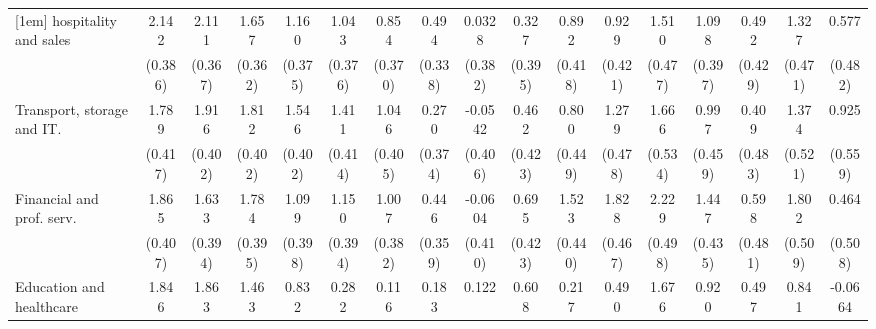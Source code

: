 {\begin{tabular}{l*{16}{c}}
[1em]
hospitality and sales&       2.142\sym{***}&       2.111\sym{***}&       1.657\sym{***}&       1.160\sym{**} &       1.043\sym{**} &       0.854\sym{*}  &       0.494         &      0.0328         &       0.327         &       0.892\sym{*}  &       0.929\sym{*}  &       1.510\sym{**} &       1.098\sym{**} &       0.492         &       1.327\sym{**} &       0.577         \\
                    &     (0.386)         &     (0.367)         &     (0.362)         &     (0.375)         &     (0.376)         &     (0.370)         &     (0.338)         &     (0.382)         &     (0.395)         &     (0.418)         &     (0.421)         &     (0.477)         &     (0.397)         &     (0.429)         &     (0.471)         &     (0.482)         \\
[1em]
Transport, storage and IT.&       1.789\sym{***}&       1.916\sym{***}&       1.812\sym{***}&       1.546\sym{***}&       1.411\sym{***}&       1.046\sym{**} &       0.270         &     -0.0542         &       0.462         &       0.800         &       1.279\sym{**} &       1.666\sym{**} &       0.997\sym{*}  &       0.409         &       1.374\sym{**} &       0.925         \\
                    &     (0.417)         &     (0.402)         &     (0.402)         &     (0.402)         &     (0.414)         &     (0.405)         &     (0.374)         &     (0.406)         &     (0.423)         &     (0.449)         &     (0.478)         &     (0.534)         &     (0.459)         &     (0.483)         &     (0.521)         &     (0.559)         \\
[1em]
Financial and prof. serv.&       1.865\sym{***}&       1.633\sym{***}&       1.784\sym{***}&       1.099\sym{**} &       1.150\sym{**} &       1.007\sym{**} &       0.446         &     -0.0604         &       0.695         &       1.523\sym{***}&       1.828\sym{***}&       2.229\sym{***}&       1.447\sym{***}&       0.598         &       1.802\sym{***}&       0.464         \\
                    &     (0.407)         &     (0.394)         &     (0.395)         &     (0.398)         &     (0.394)         &     (0.382)         &     (0.359)         &     (0.410)         &     (0.423)         &     (0.440)         &     (0.467)         &     (0.498)         &     (0.435)         &     (0.481)         &     (0.509)         &     (0.508)         \\
[1em]
Education and healthcare&       1.846\sym{***}&       1.863\sym{***}&       1.463\sym{**} &       0.832         &       0.282         &       0.116         &       0.183         &       0.122         &       0.608         &       0.217         &       0.490         &       1.676\sym{**} &       0.920         &       0.497         &       0.841         &     -0.0664         \\

\end{tabular}}
